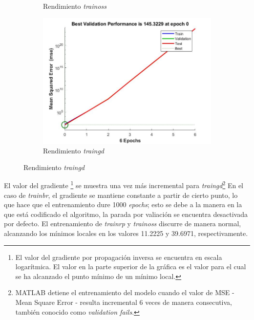 \documentclass{article}
\begin{document}
\begin{figure}[H]
\begin{subfigure}{0.4\textwidth}
  \caption{Rendimiento \textit{trainoss}}
 \end{subfigure}
 \begin{subfigure}{0.4\textwidth}
  \includegraphics[width=0.8\linewidth]{../images/I_ex3_performance_bodyfat_dataset_traingd.jpg}
  \caption{Rendimiento \textit{traingd}}
 \end{subfigure}
\end{figure}

El valor del gradiente \footnote{El valor del gradiente por propagación inversa
se encuentra en escala logarítmica. El valor en la parte superior de la gráfica
es el valor para el cual se ha alcanzado el punto mínimo de un mínimo local.} se 
muestra una vez más incremental para \textit{traingd}\footnote{MATLAB detiene el 
entrenamiento del modelo cuando el valor de MSE - Mean Square Error - resulta 
incremental 6 veces de manera consecutiva, también conocido como 
\textit{validation fails}.} En el caso de \textit{trainbr}, el gradiente se 
mantiene constante a partir de cierto punto, lo que hace que el entrenamiento 
dure 1000 \textit{epochs}; esto se debe a la manera en la que está codificado el
algoritmo, la parada por valiación se encuentra desactivada por defecto. El 
entrenamiento de \textit{trainrp} y \textit{trainoss} discurre de manera normal, 
alcanzando los mínimos locales en los valores 11.2225 y 39.6971, respectivamente.
\end{document}
